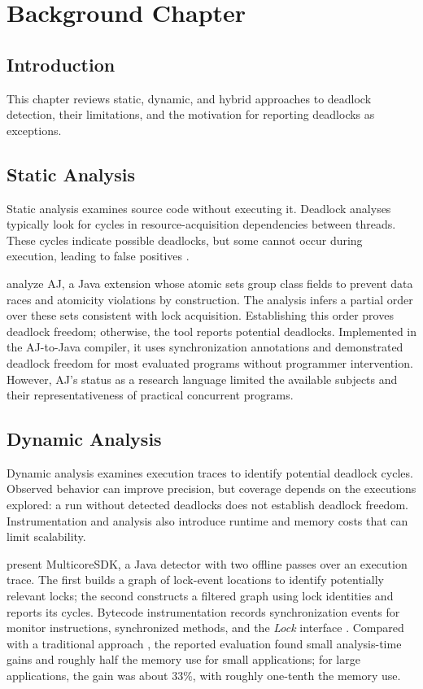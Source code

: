 \chapter{Background Chapter}
\label{background}

\section{Introduction}

This chapter reviews static, dynamic, and hybrid approaches to deadlock detection, their limitations, and the motivation for reporting deadlocks as exceptions.

\section{Static Analysis}

Static analysis examines source code without executing it. Deadlock analyses typically look for cycles in resource-acquisition dependencies between threads.
These cycles indicate possible deadlocks, but some cannot occur during execution, leading to false positives \citep{dawson,chand,vivek,praun,cormac,williams}.

\citet{marino} analyze AJ, a Java extension whose atomic sets group class fields to prevent data races and atomicity violations by construction.
The analysis infers a partial order over these sets consistent with lock acquisition. Establishing this order proves deadlock freedom; otherwise, the tool reports potential deadlocks.
Implemented in the AJ-to-Java compiler, it uses synchronization annotations and demonstrated deadlock freedom for most evaluated programs without programmer intervention.
However, AJ's status as a research language limited the available subjects and their representativeness of practical concurrent programs.

\section{Dynamic Analysis}

Dynamic analysis examines execution traces to identify potential deadlock cycles. Observed behavior can improve precision, but coverage depends on the executions explored: a run without detected deadlocks does not establish deadlock freedom.
Instrumentation and analysis also introduce runtime and memory costs that can limit scalability.

\citet{mcsdk} present MulticoreSDK, a Java detector with two offline passes over an execution trace.
The first builds a graph of lock-event locations to identify potentially relevant locks; the second constructs a filtered graph using lock identities and reports its cycles.
Bytecode instrumentation records synchronization events for monitor instructions, synchronized methods, and the \emph{Lock} interface \citep{tanter}.
Compared with a traditional approach \citep{contest}, the reported evaluation found small analysis-time gains and roughly half the memory use for small applications; for large applications, the gain was about 33\%, with roughly one-tenth the memory use.

